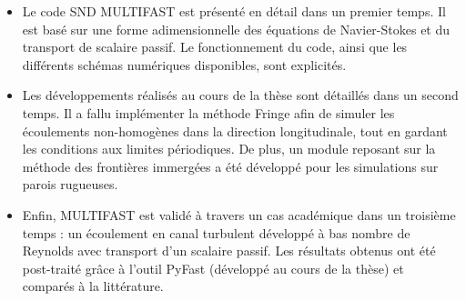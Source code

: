 \begin{itemize}

	\item Le code SND MULTIFAST est présenté en détail dans un premier temps. Il est basé sur une forme adimensionnelle des équations de Navier-Stokes et du transport de scalaire passif. Le fonctionnement du code, ainsi que les différents schémas numériques disponibles, sont explicités.

	\item Les développements réalisés au cours de la thèse sont détaillés dans un second temps. Il a fallu implémenter la méthode Fringe afin de simuler les écoulements non-homogènes dans la direction longitudinale, tout en gardant les conditions aux limites périodiques. De plus, un module reposant sur la méthode des frontières immergées a été développé pour les simulations sur parois rugueuses.

	\item Enfin, MULTIFAST est validé à travers un cas académique dans un troisième temps : un écoulement en canal turbulent développé à bas nombre de Reynolds avec transport d'un scalaire passif. Les résultats obtenus ont été post-traité grâce à l'outil PyFast (développé au cours de la thèse) et comparés à la littérature.


\end{itemize}
